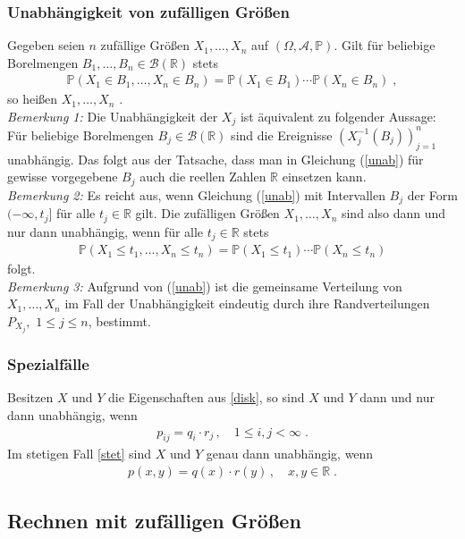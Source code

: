 \documentclass[ngerman,draft,parskip=half,twoside]{scrartcl}
\newcommand*{\highl}[2][]{\textbf{\boldmath{#2}}%
  \ifthenelse{\equal{#1}{}}{\index{#2}}{\index{#1}}%
}
\newcommand*{\R}{\mathbb{R}}      %
\newcommand*{\Algeb}{\mathcal{A}}   %
\newcommand*{\BorelM}{\mathcal{B}}  %
\newcommand*{\WKM}{\mathbb{P}}      %
\begin{document}
\subsubsection{Unabhängigkeit von zufälligen Größen}
Gegeben seien $n$ zufällige Größen $X_1,\ldots,X_n$ auf $(\Omega,\Algeb,\WKM)$. Gilt für beliebige
Borelmengen $B_1,\ldots,B_n\in\BorelM(\R)$ stets
\begin{gather}
\label{unab}
\WKM(X_1\in B_1,\ldots,X_n\in B_n)=\WKM(X_1\in B_1)\cdots\WKM(X_n\in B_n)\;,
\end{gather}
so heißen $X_1,\ldots,X_n$ \highl{unabhängig}.\\
\textit{Bemerkung 1:} Die Unabhängigkeit der $X_j$ ist äquivalent zu folgender Aussage: Für
beliebige Borelmengen $B_j\in\BorelM(\R)$ sind die Ereignisse $\left(X_j^{-1}(B_j)\right)_{j=1}^n$
unabhängig. Das folgt aus der Tatsache, dass man in Gleichung (\ref{unab}) für gewisse vorgegebene $B_j$ auch die
reellen Zahlen $\R$ einsetzen kann.\\
\textit{Bemerkung 2:} Es reicht aus, wenn Gleichung (\ref{unab}) mit Intervallen $B_j$ der Form
$(-\infty,t_j]$ für alle $t_j\in\R$ gilt. Die zufälligen Größen $X_1,\ldots,X_n$ sind also
dann und nur dann unabhängig, wenn für alle $t_j\in\R$ stets
\begin{gather*}
  \WKM(X_1\le t_1,\ldots,X_n\le t_n)=\WKM(X_1\le t_1)\cdots\WKM(X_n\le t_n)
\end{gather*}
folgt.\\
\textit{Bemerkung 3:} Aufgrund von (\ref{unab}) ist die gemeinsame Verteilung von $X_1,\ldots,X_n$
im Fall der Unabhängigkeit eindeutig durch
ihre Randverteilungen $P_{X_j},$ $1\le j\le n$, bestimmt.
\subsubsection{Spezialfälle}
Besitzen $X$ und $Y$ die Eigenschaften aus \ref{disk}, so sind $X$ und $Y$ dann und nur  dann
unabhängig, wenn
\begin{gather*}
  p_{ij}=q_i\cdot r_j\,,\quad 1\le i,j<\infty\;.
\end{gather*}
Im stetigen Fall \ref{stet} sind $X$ und $Y$ genau dann unabhängig, wenn
\begin{gather*}
  p(x,y)=q(x)\cdot r(y)\,,\quad x,y\in\R\;.
\end{gather*}
\subsection{Rechnen mit zufälligen Größen}
\end{document}
